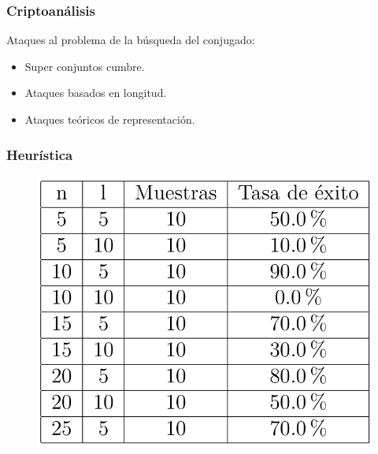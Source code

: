 \documentclass{beamer}
\begin{document}
\begin{frame}
\frametitle{Criptoanálisis}
Ataques al problema de la búsqueda del conjugado:
\begin{itemize}
\item Super conjuntos cumbre.
\item Ataques basados en longitud.
\item Ataques teóricos de representación.
\end{itemize}


\end{frame}


\begin{frame}
\frametitle{Heurística}

\begin{figure}
\includegraphics[scale=0.198]{imgs/imgs_trenzas/result_heur}
\end{figure}

\end{frame}
\end{document}
